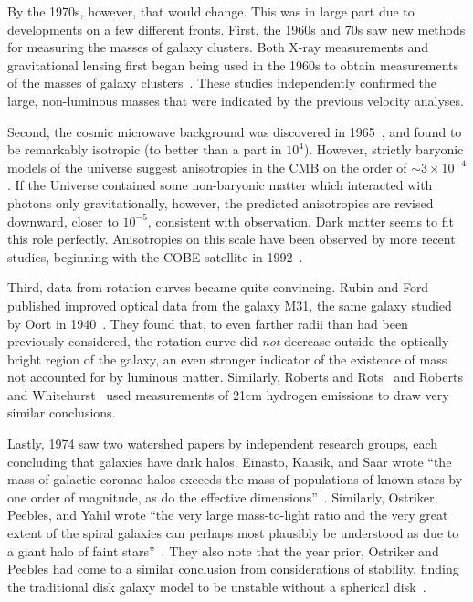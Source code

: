 By the 1970s, however, that would change. This was in large part due to
developments on a few different fronts. First, the 1960s and 70s saw new
methods for measuring the masses of galaxy clusters. Both X-ray measurements
and gravitational lensing first began being used in the 1960s to obtain
measurements of the masses of galaxy clusters~\cite{trimble_history_2013}.
These studies independently confirmed the large, non-luminous masses that were
indicated by the previous velocity analyses.

Second, the cosmic microwave background was discovered in
1965~\cite{penzias_measurement_1965,dicke_cosmic_1965}, and found to be
remarkably isotropic (to better than a part in \(10^4\)).  However, strictly
baryonic models of the universe suggest anisotropies in the CMB on the order
of \(\sim 3 \times 10^{-4}\).  If the Universe contained some non-baryonic
matter which interacted with photons only gravitationally, however, the
predicted anisotropies are revised downward, closer to \(10^{-5}\), consistent
with observation.  Dark matter seems to fit this role perfectly.  Anisotropies
on this scale have been observed by more recent studies, beginning with the
COBE satellite in 1992~\cite{smoot_structure_1992,efstathiou_cobe_1992}.

Third, data from rotation curves became quite convincing. Rubin and Ford
published improved optical data from the galaxy M31, the same galaxy studied
by Oort in 1940~\cite{rubin_rotation_1970}. They found that, to even farther
radii than had been previously considered, the rotation curve did \emph{not}
decrease outside the optically bright region of the galaxy, an even stronger
indicator of the existence of mass not accounted for by luminous matter.
Similarly, Roberts and Rots~\cite{roberts_comparison_1973} and Roberts and
Whitehurst~\cite{roberts_rotation_1975} used measurements of 21cm hydrogen
emissions to draw very similar conclusions.

Lastly, 1974 saw two watershed papers by independent research groups, each
concluding that galaxies have dark halos. Einasto, Kaasik, and Saar wrote
``the mass of galactic coronae halos exceeds the mass of populations of known
stars by one order of magnitude, as do the effective
dimensions''~\cite{einasto_missing_1974}. Similarly, Ostriker, Peebles, and
Yahil wrote ``the very large mass-to-light ratio and the very great extent of
the spiral galaxies can perhaps most plausibly be understood as due to a giant
halo of faint stars''~\cite{ostriker_size_1974}. They also note that the year
prior, Ostriker and Peebles had come to a similar conclusion from
considerations of stability, finding the traditional disk galaxy model to be
unstable without a spherical disk~\cite{ostriker_numerical_1973}.

